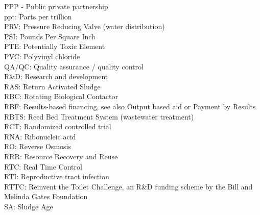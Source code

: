 \documentclass{article}
\begin{document}
PPP - Public private partnership
\vspace{0.3cm}\\
ppt:  Parts per trillion
\vspace{0.3cm}\\
PRV:  Pressure Reducing Valve (water distribution)
\vspace{0.3cm}\\
PSI:  Pounds Per Square Inch
\vspace{0.3cm}\\
PTE:  Potentially Toxic Element
\vspace{0.3cm}\\
PVC:  Polyvinyl chloride
\vspace{0.3cm}\\
QA/QC:  Quality assurance / quality control
\vspace{0.3cm}\\
R\&D:  Research and development
\vspace{0.3cm}\\
RAS:  Return Activated Sludge
\vspace{0.3cm}\\
RBC: Rotating Biological Contactor
\vspace{0.3cm}\\
RBF:  Results-based financing, see also Output based aid or Payment by Results
\vspace{0.3cm}\\
RBTS:  Reed Bed Treatment System (wastewater treatment)
\vspace{0.3cm}\\
RCT:  Randomized controlled trial
\vspace{0.3cm}\\
RNA:  Ribonucleic acid
\vspace{0.3cm}\\
RO:  Reverse Osmosis
\vspace{0.3cm}\\
RRR:  Resource Recovery and Reuse
\vspace{0.3cm}\\
RTC:  Real Time Control
\vspace{0.3cm}\\
RTI:  Reproductive tract infection
\vspace{0.3cm}\\
RTTC:  Reinvent the Toilet Challenge, an R\&D funding scheme by the Bill and Melinda Gates Foundation
\vspace{0.3cm}\\
SA:  Sludge Age
\end{document}
